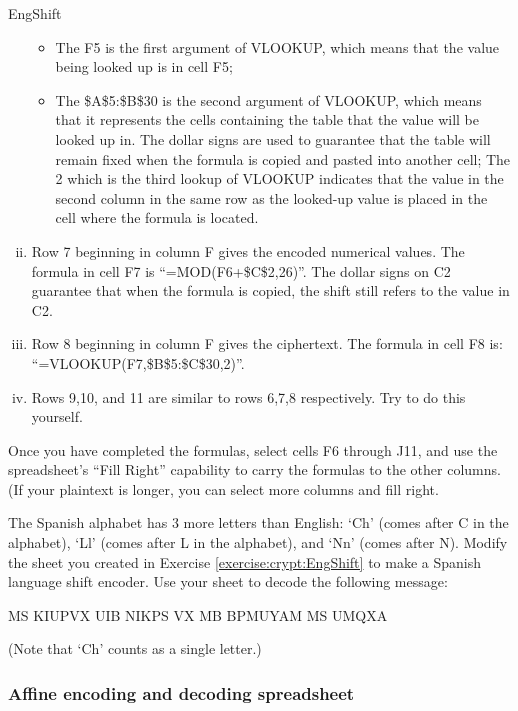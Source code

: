 \begin{exercise}{EngShift}
\begin{enumerate}[(i)]
\begin{itemize}
\item
The F5 is the first argument of VLOOKUP, which means that the value being looked up is in cell F5;
\item
The \$A\$5:\$B\$30 is the second argument of VLOOKUP, which means that it represents the cells containing the table that the value will be looked up in.  The dollar signs are used to guarantee that the table will remain fixed when the formula is copied and pasted into another cell;
The 2 which is the third lookup of VLOOKUP indicates that the value in the second column in the same row as the looked-up value is placed in the cell where the formula is located.
\end{itemize}
\item
Row 7 beginning in column F gives the encoded numerical values. The formula in cell F7 is ``=MOD(F6+\$C\$2,26)''.  The dollar signs on C2 guarantee that when the formula is copied, the shift still refers to the value in C2.
\item
Row 8 beginning in column F gives the ciphertext.  The formula in cell F8 is: ``=VLOOKUP(F7,\$B\$5:\$C\$30,2)''. 
\item
Rows 9,10, and 11 are similar to rows 6,7,8 respectively. Try to do this yourself. 
\end{enumerate}
Once you have completed the formulas, select cells F6 through J11, and use the spreadsheet's ``Fill Right'' capability to carry the formulas to the other columns.  (If your plaintext is longer, you can select more columns and fill right.
\end{exercise}

\begin{exercise}{}
The Spanish alphabet has 3 more letters than English:  `Ch' (comes after C in the alphabet), `Ll'  (comes after L in the alphabet), and `Nn' (comes after N).  Modify the sheet you created in Exercise \ref{exercise:crypt:EngShift} to make a Spanish language shift encoder.  Use your sheet to decode the following message:

MS KIUPVX	UIB NIKPS VX MB BPMUYAM MS UMQXA

(Note that `Ch' counts as a single letter.)
\end{exercise}

\subsubsection*{Affine encoding and decoding spreadsheet
\quad
{}}

